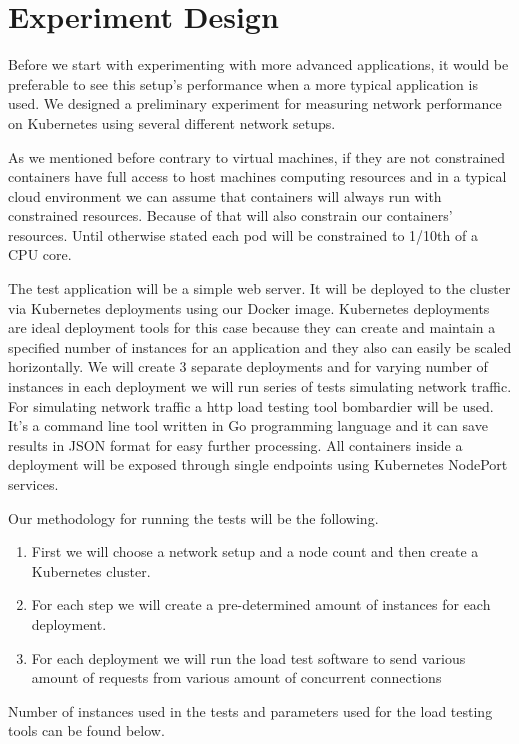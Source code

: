 \documentclass[12pt,oneandhalf,chaparabic,ceng,ms,eng,oneside,pntc]{gsufbe}
\begin{document}
\section{Experiment Design}
Before we start with experimenting with more advanced applications, it would be preferable to see this
setup's performance when a more typical application is used. We designed a preliminary experiment for
measuring network performance on Kubernetes using several different network setups.

As we mentioned before contrary to virtual machines, if they are not constrained containers have full
access to host machines computing resources and in a typical cloud environment we can assume that
containers will always run with constrained resources. Because of that will also constrain our
containers' resources. Until otherwise stated each pod will be constrained to 1/10th of a CPU core.

The test application will be a simple web server. It will be deployed to the cluster via Kubernetes
deployments using our Docker image. Kubernetes deployments are ideal deployment tools for this case 
because they can create and maintain a specified number of instances for an application and they also
can easily be scaled horizontally. We will create 3 separate deployments and for varying number of
instances in each deployment we will run series of tests simulating network traffic. For simulating
network traffic a http load testing tool bombardier will be used. It's a command line tool written in
Go programming language and it can save results in JSON format for easy further processing. All
containers inside a deployment will be exposed through single endpoints using Kubernetes NodePort 
services.

Our methodology for running the tests will be the following. 
\begin{enumerate}
 \item First we will choose a network setup and a node count and then create a Kubernetes cluster.
 \item For each step we will create a pre-determined amount of instances for each deployment.
 \item For each deployment we will run the load test software to send various amount of requests from
 various amount of concurrent connections
\end{enumerate}

Number of instances used in the tests and parameters used for the load testing tools can be found below.
\end{document}
